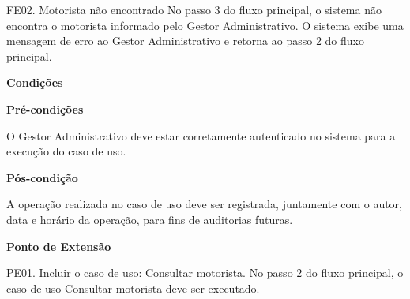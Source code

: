     FE02. Motorista não encontrado
	No passo 3 do fluxo principal, o sistema não encontra o motorista informado pelo Gestor Administrativo. O sistema exibe uma
	mensagem de erro ao Gestor Administrativo e retorna ao passo 2 do fluxo principal.

	
   {\raggedright
      \textbf{Condições}
   }
   
    
   \textbf{Pré-condições}
   
   O Gestor Administrativo deve estar corretamente autenticado no sistema para a execução do caso de uso.
   
   \textbf{Pós-condição}
   
   A operação realizada no caso de uso deve ser registrada, juntamente com o autor, data e horário da operação, para fins de auditorias futuras.


   {\raggedright
      \textbf{Ponto de Extensão}
   }
   
   
    PE01. Incluir o caso de uso: Consultar motorista.
	    No passo 2 do fluxo principal, o caso de uso Consultar motorista deve ser executado.
   


  \vfill
  \pagebreak